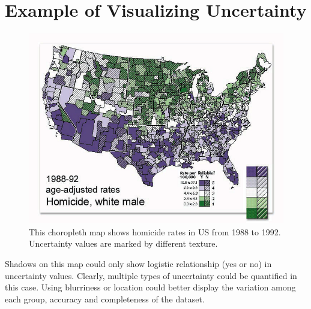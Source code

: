 \documentclass[11pt,letterpaper]{article}
\begin{document}
\section*{Example of Visualizing Uncertainty }
\begin{figure}[h]
\includegraphics[scale=0.65]{memo_fig4.png}
\caption{This choropleth map shows homicide rates in US from 1988 to 1992. \\
Uncertainty values are marked by different texture.}
\end{figure}

\noindent Shadows on this map could only show logistic relationship (yes or no) in uncertainty values. Clearly, multiple types of uncertainty could be quantified in this case. Using blurriness or location could better display the 
variation among each group, accuracy and completeness of the dataset.
\end{document}
